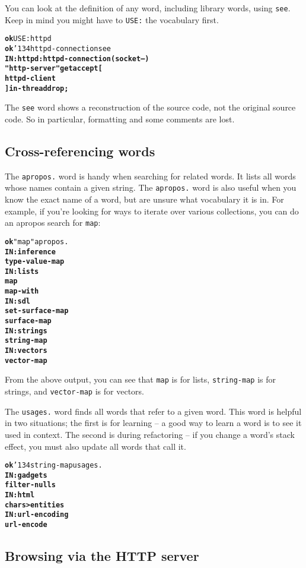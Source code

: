\documentclass{article}
\newcommand{\ttbs}{\char'134}
\begin{document}
You can look at the definition of any word, including library words, using \texttt{see}. Keep in mind you might have to \texttt{USE:} the vocabulary first.

\begin{alltt}
\textbf{ok} USE: httpd
\textbf{ok} \ttbs httpd-connection see
\textbf{IN: httpd : httpd-connection ( socket -- )
    "http-server" get accept [
        httpd-client
    ] in-thread drop ;}
\end{alltt}

The \texttt{see} word shows a reconstruction of the source code, not the original source code. So in particular, formatting and some comments are lost.

\subsection{Cross-referencing words}

The \texttt{apropos.} word is handy when searching for related words. It lists all words
whose names contain a given string. The \texttt{apropos.} word is also useful when you know the exact name of a word, but are unsure what vocabulary it is in. For example, if you're looking for ways to iterate over various collections, you can do an apropos search for \texttt{map}:

\begin{alltt}
\textbf{ok} "map" apropos.
\textbf{IN: inference
type-value-map
IN: lists
map
map-with
IN: sdl
set-surface-map
surface-map
IN: strings
string-map
IN: vectors
vector-map}
\end{alltt}

From the above output, you can see that \texttt{map} is for lists, \texttt{string-map} is for strings, and \texttt{vector-map} is for vectors.

The \texttt{usages.} word finds all words that refer to a given word. This word is helpful in two situations; the first is for learning -- a good way to learn a word is to see it used in context. The second is during refactoring -- if you change a word's stack effect, you must also update all words that call it.

\begin{alltt}
\textbf{ok} \ttbs string-map usages.
\textbf{IN: gadgets
filter-nulls
IN: html
chars>entities
IN: url-encoding
url-encode}
\end{alltt}

\subsection{Browsing via the HTTP server}
\end{document}
